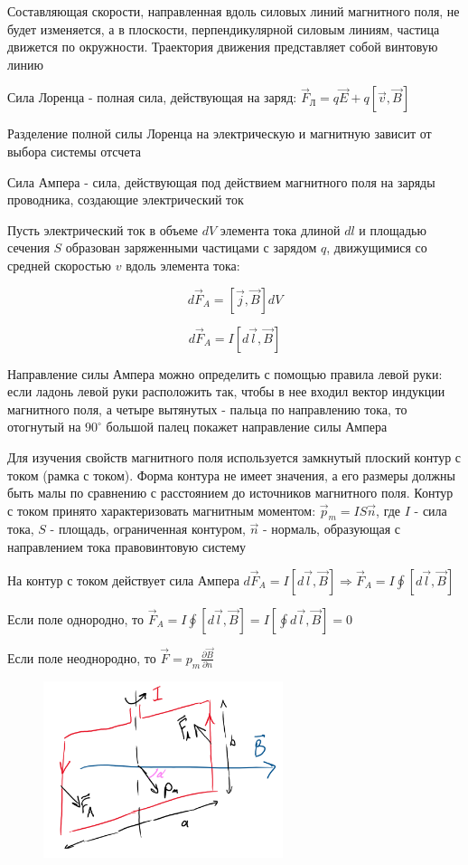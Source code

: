 Составляющая скорости, направленная вдоль силовых линий магнитного поля, не будет изменяется, 
а в плоскости, перпендикулярной силовым линиям, частица движется по окружности. Траектория движения 
представляет собой винтовую линию

\Mem Сила Лоренца - полная сила, действующая на заряд: $\vec{F}_\text{Л} = q\vec{E} + q[\vec{v}, \vec{B}]$

Разделение полной силы Лоренца на электрическую и магнитную зависит от выбора системы отсчета

\Def Сила Ампера - сила, действующая под действием магнитного поля на заряды проводника, создающие электрический ток

Пусть электрический ток в объеме $dV$ элемента тока длиной $dl$ и площадью сечения $S$ образован заряженными частицами с зарядом
$q$, движущимися со средней скоростью $v$ вдоль элемента тока: 

\[d\vec{F}_A = [\vec{j}, \vec{B}] dV\]

\[d\vec{F}_A = I [d\vec{l}, \vec{B}]\]

Направление силы Ампера можно определить с помощью правила левой руки: если ладонь левой руки расположить так,
чтобы в нее входил вектор индукции магнитного поля, а четыре вытянутых - пальца по направлению тока, то отогнутый
на $90^\circ$ большой палец покажет направление силы Ампера

Для изучения свойств магнитного поля используется замкнутый плоский контур с током (рамка с током). Форма контура
не имеет значения, а его размеры должны быть малы по сравнению с расстоянием до источников магнитного поля.
Контур с током принято характеризовать магнитным моментом: $\vec{p}_m = I S \vec{n}$, где $I$ - сила тока, $S$ - площадь,
ограниченная контуром, $\vec{n}$ - нормаль, образующая с направлением тока правовинтовую систему

На контур с током действует сила Ампера $d\vec{F}_A = I[d\vec{l}, \vec{B}] \Longrightarrow \vec{F}_A = I \oint [d\vec{l}, \vec{B}]$

Если поле однородно, то $\vec{F}_A = I \oint [d\vec{l}, \vec{B}] = I [\oint d\vec{l}, \vec{B}] = 0$

Если поле неоднородно, то $\vec{F} = p_m \frac{\partial \vec{B}}{\partial n}$

\begin{figure}
    \includegraphics[width=7cm]{physics2/images/physics2_2025_02_24_2}
\end{figure}

